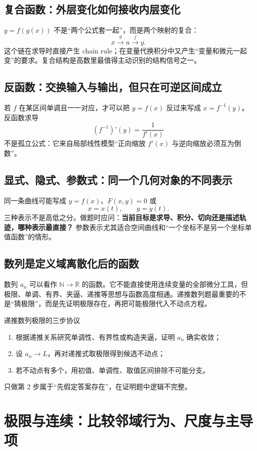 \documentclass[11pt,a4paper,openany]{ctexbook}
\newcommand{\key}[1]{\textbf{\color{deep}#1}}
\begin{document}
\section{复合函数：外层变化如何接收内层变化}
$y=f(g(x))$ 不是“两个公式套一起”，而是两个映射的复合：
\[
x\xrightarrow{g}u\xrightarrow{f}y.
\]
这个链在求导时直接产生 chain rule；在变量代换积分中又产生“变量和微元一起变”的要求。复合结构是高数里最值得主动识别的结构信号之一。

\section{反函数：交换输入与输出，但只在可逆区间成立}
若 $f$ 在某区间单调且一一对应，才可以把 $y=f(x)$ 反过来写成 $x=f^{-1}(y)$。反函数求导
\[
(f^{-1})'(y)=\frac{1}{f'(x)}
\]
不是孤立公式：它来自局部线性模型“正向缩放 $f'(x)$ 与逆向缩放必须互为倒数”。

\section{显式、隐式、参数式：同一个几何对象的不同表示}
同一条曲线可能写成 $y=f(x)$、$F(x,y)=0$ 或
\[
x=x(t),\qquad y=y(t).
\]
三种表示不是高低之分。做题时应问：\key{当前目标是求导、积分、切向还是描述轨迹，哪种表示最直接？}
参数表示尤其适合空间曲线和“一个坐标不是另一个坐标单值函数”的情形。

\section{数列是定义域离散化后的函数}
数列 $a_n$ 可以看作 $\mathbb N\to\mathbb R$ 的函数。它不能直接使用连续变量的全部微分工具，但极限、单调、有界、夹逼、递推等思想与函数高度相通。递推数列题最重要的不是“猜极限”，而是先证明极限存在，再把可能极限代入不动点方程。

\begin{examBox}{递推数列极限的三步协议}
\begin{enumerate}
  \item 根据递推关系研究单调性、有界性或构造夹逼，证明 $a_n$ 确实收敛；
  \item 设 $a_n\to L$，再对递推式取极限得到候选不动点；
  \item 若不动点有多个，用初值、单调性、取值区间排除不可能分支。
\end{enumerate}
只做第 2 步属于“先假定答案存在”，在证明题中逻辑不完整。
\end{examBox}

\chapter{极限与连续：比较邻域行为、尺度与主导项}
\end{document}
